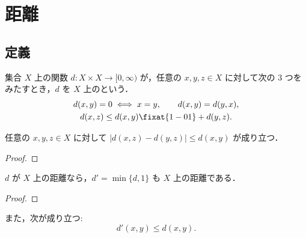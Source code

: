 \chapter{距離}\label{ch:1}

\section{定義}\label{sec:1.1}

\begin{definition}\label{thm:1.1.1}
集合 $X$ 上の関数 $d\colon X\times X\to[0,\infty)$ が，任意の $x,y,z\in X$ に対して次の 3 つをみたすとき，$d$ を $X$ 上のという．
\begin{equation}\label{eq:1.1}
\begin{gathered}
d(x,y)=0 \iff x=y,\qquad d(x,y)=d(y,x),\\
d(x,z)\le d(x,y)\fixat{1-01}+d(y,z).
\end{gathered}
\end{equation}
\end{definition}

\begin{proposition}\label{thm:1.1.2}
任意の $x,y,z\in X$ に対して $|d(x,z)-d(y,z)|\le d(x,y)$ が成り立つ．
\end{proposition}
\begin{proof}
\end{proof}

\begin{proposition}\label{thm:1.1.3}
$d$ が $X$ 上の距離なら，$d'=\min\{d,1\}$ も $X$ 上の距離である．
\end{proposition}
\begin{proof}
\end{proof}

また，次が成り立つ:
\begin{equation}\label{eq:1.3}
d'(x,y)\le d(x,y).
\end{equation}

